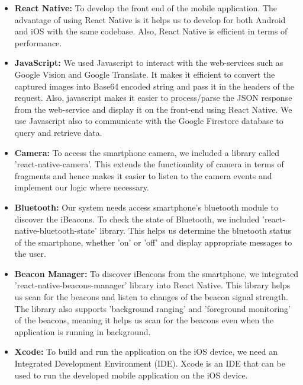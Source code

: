 \documentclass[12pt]{article}
\begin{document}
\begin{itemize}
  \item \textbf{React Native:} To develop the front end of the mobile application. The advantage of using React Native is it helps us to develop for both Android and iOS with the same codebase. Also, React Native is efficient in terms of performance.
  
   \item \textbf{JavaScript:} We used Javascript to interact with the web-services such as Google Vision and Google Translate. It makes it efficient to convert the captured images into Base64 encoded string and pass it in the headers of the request. Also, javascript makes it easier to process/parse the JSON response from the web-service and display it on the front-end using React Native. We use Javascript also to communicate with the Google Firestore database to query and retrieve data.
  
      \item \textbf{Camera:} To access the smartphone camera, we included a library called 'react-native-camera'. This extends the functionality of camera in terms of fragments and hence makes it easier to listen to the camera events and implement our logic where necessary.
      
        \item \textbf{Bluetooth:} Our system needs access smartphone's bluetooth module to discover the iBeacons. To check the state of Bluetooth, we included 'react-native-bluetooth-state' library. This helps us determine the bluetooth status of the smartphone, whether 'on' or 'off' and display appropriate messages to the user.
        
        \item \textbf{Beacon Manager:} To discover iBeacons from the smartphone, we integrated 'react-native-beacons-manager' library into React Native. This library helps us scan for the beacons and listen to changes of the beacon signal strength. The library also supports 'background ranging' and 'foreground monitoring' of the beacons, meaning it helps us scan for the beacons even when the application is running in background. 
      
      \item \textbf{Xcode:} To build and run the application on the iOS device, we need an Integrated Development Environment (IDE). Xcode is an IDE that can be used to run the developed mobile application on the iOS device.
      
 \end{itemize}
 
\end{document}
